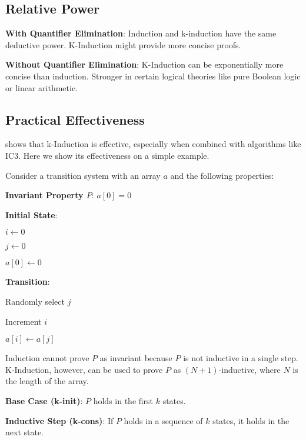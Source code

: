 \subsection*{Relative Power}
\noindent    \textbf{With Quantifier Elimination}:
        Induction and k-induction have the same deductive power. K-Induction might provide more concise proofs.

\noindent    \textbf{Without Quantifier Elimination}:
        K-Induction can be exponentially more concise than induction. Stronger in certain logical theories like pure Boolean logic or linear arithmetic.

\subsection*{Practical Effectiveness}
\noindent \cite{7886665} shows that k-Induction is effective, especially when combined with algorithms like IC3.
Here we show its effectiveness on a simple example.

\vspace{\baselineskip}\noindent Consider a transition system with an array \( a \) and the following properties:


\vspace{\baselineskip}\noindent \textbf{Invariant Property \( P \)}: \( a[0] = 0 \)

\noindent \textbf{Initial State}:

\( i \gets 0 \)

\( j \gets 0 \)

\( a[0] \gets 0 \)

\newpage
\vspace{\baselineskip}\noindent \textbf{Transition}:

Randomly select \( j \)

Increment \( i \)

\( a[i] \gets a[j] \)

\vspace{\baselineskip}Induction cannot prove \( P \) as invariant because \( P \) is not inductive in a single step. K-Induction, however, can be used to prove \( P \) as \( (N+1) \)-inductive, where \( N \) is the length of the array.

\vspace{\baselineskip}\noindent \textbf{Base Case (k-init)}: \( P \) holds in the first \( k \) states.

\noindent \textbf{Inductive Step (k-cons)}: If \( P \) holds in a sequence of \( k \) states, it holds in the next state.

